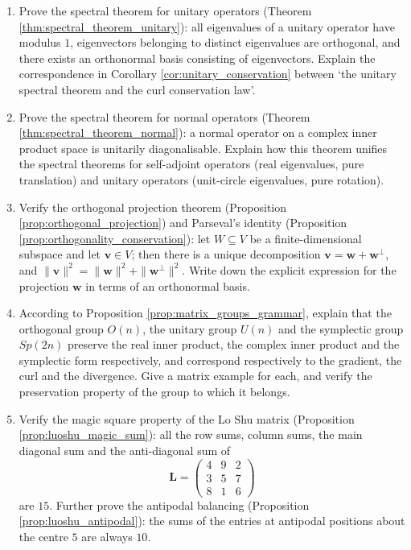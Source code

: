 \begin{enumerate}[leftmargin=3em, label=\textbf{Exercise \arabic*}]
    \item Prove the spectral theorem for unitary operators (Theorem \ref{thm:spectral_theorem_unitary}):
    all eigenvalues of a unitary operator have modulus $1$, eigenvectors belonging to distinct eigenvalues are orthogonal,
    and there exists an orthonormal basis consisting of eigenvectors.
    Explain the correspondence in Corollary \ref{cor:unitary_conservation}
    between `the unitary spectral theorem and the curl conservation law'.

    \item Prove the spectral theorem for normal operators (Theorem \ref{thm:spectral_theorem_normal}):
    a normal operator on a complex inner product space is unitarily diagonalisable.
    Explain how this theorem unifies the spectral theorems for self-adjoint operators (real eigenvalues, pure translation)
    and unitary operators (unit-circle eigenvalues, pure rotation).

    \item Verify the orthogonal projection theorem (Proposition \ref{prop:orthogonal_projection}) and Parseval's identity
    (Proposition \ref{prop:orthogonality_conservation}):
    let $W\subseteq V$ be a finite-dimensional subspace and let $\mathbf{v}\in V$;
    then there is a unique decomposition $\mathbf{v}=\mathbf{w}+\mathbf{w}^\perp$,
    and $\|\mathbf{v}\|^2=\|\mathbf{w}\|^2+\|\mathbf{w}^\perp\|^2$.
    Write down the explicit expression for the projection $\mathbf{w}$ in terms of an orthonormal basis.

    \item According to Proposition \ref{prop:matrix_groups_grammar}, explain that the orthogonal group $O(n)$,
    the unitary group $U(n)$ and the symplectic group $Sp(2n)$ preserve the real inner product, the complex inner product and the symplectic form respectively,
    and correspond respectively to the gradient, the curl and the divergence.
    Give a matrix example for each, and verify the preservation property of the group to which it belongs.

    \item Verify the magic square property of the Lo Shu matrix (Proposition \ref{prop:luoshu_magic_sum}):
    all the row sums, column sums, the main diagonal sum and the anti-diagonal sum of
    \[
    \mathbf{L}=\begin{pmatrix}4&9&2\\3&5&7\\8&1&6\end{pmatrix}
    \]
    are $15$.
    Further prove the antipodal balancing (Proposition \ref{prop:luoshu_antipodal}):
    the sums of the entries at antipodal positions about the centre $5$ are always $10$.


\end{enumerate}
